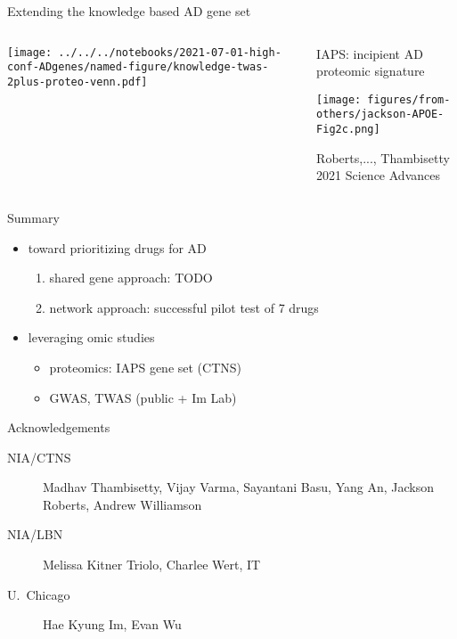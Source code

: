 \documentclass[aspectratio=169]{beamer}
\begin{document}
\begin{frame}{Extending the knowledge based AD gene set}
\begin{columns}[t]
\begin{column}{0.5\textwidth}

\texttt{[image: ../../../notebooks/2021-07-01-high-conf-ADgenes/named-figure/knowledge-twas-2plus-proteo-venn.pdf]}
\end{column}

\begin{column}{0.5\textwidth}
\begin{center}
IAPS: incipient AD proteomic signature
\end{center}

\begin{center}
\texttt{[image: figures/from-others/jackson-APOE-Fig2c.png]}
\end{center}

\begin{center}
\tiny Roberts,..., Thambisetty 2021 Science Advances
\end{center}
\end{column}
\end{columns}
\end{frame}



\begin{frame}{Summary}
\begin{itemize}
\item toward prioritizing drugs for AD
\begin{enumerate}
\item shared gene approach: TODO
\item network approach: successful pilot test of 7 drugs
\end{enumerate}
\item leveraging omic studies
\begin{itemize}
\item proteomics: IAPS gene set (CTNS)
\item GWAS, TWAS (public + Im Lab)
\end{itemize}
\end{itemize}
\end{frame}

\begin{frame}{Acknowledgements}
\begin{description}
\item[NIA/CTNS] Madhav Thambisetty, Vijay Varma, Sayantani
	Basu, Yang An, Jackson Roberts, Andrew Williamson
\item[NIA/LBN] Melissa Kitner Triolo, Charlee Wert, IT
\item[U.~Chicago] Hae Kyung Im, Evan Wu
\end{description}
\end{frame}
\end{document}
